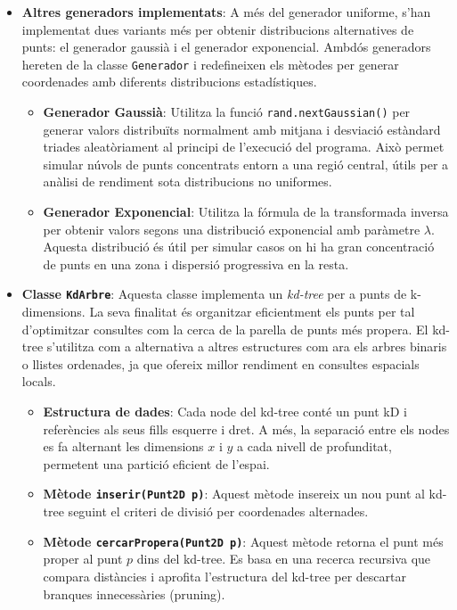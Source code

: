 \documentclass{ieeetj}
\begin{document}
\begin{itemize}
\item \textbf{Altres generadors implementats}: A més del generador uniforme, s'han implementat dues variants més per obtenir distribucions alternatives de punts: el generador gaussià i el generador exponencial. Ambdós generadors hereten de la classe \texttt{Generador} i redefineixen els mètodes per generar coordenades amb diferents distribucions estadístiques.

\begin{itemize}
    \item \textbf{Generador Gaussià}: Utilitza la funció \texttt{rand.nextGaussian()} per generar valors distribuïts normalment amb mitjana i desviació estàndard triades aleatòriament al principi de l'execució del programa.
    Això permet simular núvols de punts concentrats entorn a una regió central, útils per a anàlisi de rendiment sota distribucions no uniformes.

    \item \textbf{Generador Exponencial}: Utilitza la fórmula de la transformada inversa per obtenir valors segons una distribució exponencial amb paràmetre \(\lambda\).
    Aquesta distribució és útil per simular casos on hi ha gran concentració de punts en una zona i dispersió progressiva en la resta.
\end{itemize}
\end{itemize}

\begin{itemize}
\item \textbf{Classe \texttt{KdArbre}}: Aquesta classe implementa un \textit{kd-tree} per a punts de k-dimensions. La seva finalitat és organitzar eficientment els punts per tal d'optimitzar consultes com la cerca de la parella de punts més propera. El kd-tree s'utilitza com a alternativa a altres estructures com ara els arbres binaris o llistes ordenades, ja que ofereix millor rendiment en consultes espacials locals.

\begin{itemize}
    \item \textbf{Estructura de dades}: Cada node del kd-tree conté un punt kD i referències als seus fills esquerre i dret. A més, la separació entre els nodes es fa alternant les dimensions \(x\) i \(y\) a cada nivell de profunditat, permetent una partició eficient de l'espai.

    \item \textbf{Mètode \texttt{inserir(Punt2D p)}}: Aquest mètode insereix un nou punt al kd-tree seguint el criteri de divisió per coordenades alternades. 

    \item \textbf{Mètode \texttt{cercarPropera(Punt2D p)}}: Aquest mètode retorna el punt més proper al punt \(p\) dins del kd-tree. Es basa en una recerca recursiva que compara distàncies i aprofita l'estructura del kd-tree per descartar branques innecessàries (pruning).
\end{itemize}
\end{itemize}
\end{document}
